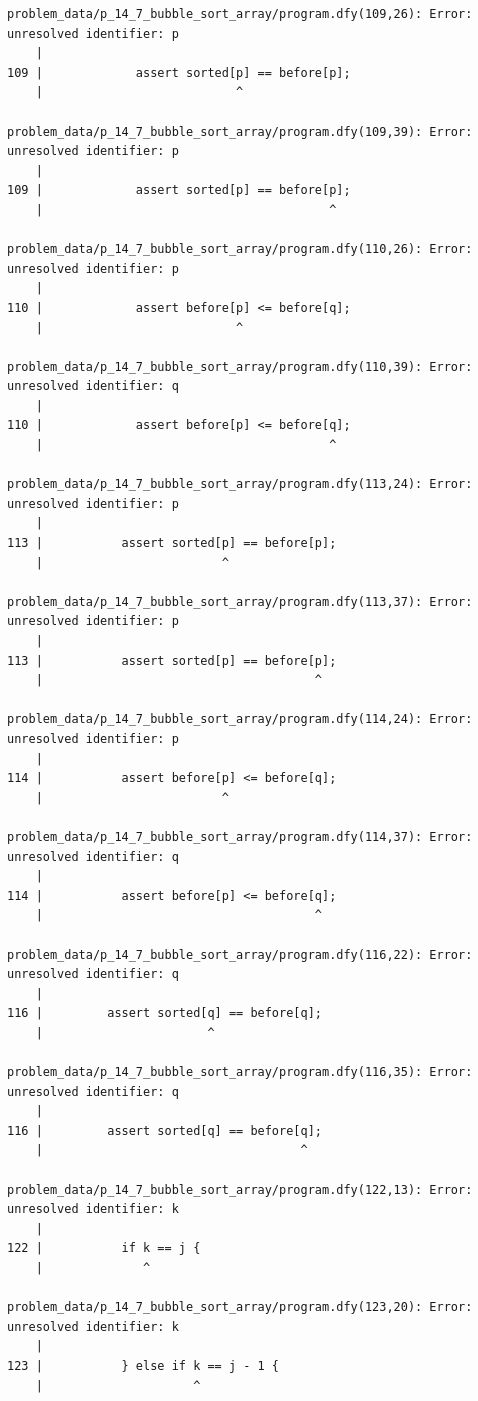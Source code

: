\documentclass{article}
\begin{document}
\begin{lstlisting}
problem_data/p_14_7_bubble_sort_array/program.dfy(109,26): Error: unresolved identifier: p
    |
109 |             assert sorted[p] == before[p];
    |                           ^

problem_data/p_14_7_bubble_sort_array/program.dfy(109,39): Error: unresolved identifier: p
    |
109 |             assert sorted[p] == before[p];
    |                                        ^

problem_data/p_14_7_bubble_sort_array/program.dfy(110,26): Error: unresolved identifier: p
    |
110 |             assert before[p] <= before[q];
    |                           ^

problem_data/p_14_7_bubble_sort_array/program.dfy(110,39): Error: unresolved identifier: q
    |
110 |             assert before[p] <= before[q];
    |                                        ^

problem_data/p_14_7_bubble_sort_array/program.dfy(113,24): Error: unresolved identifier: p
    |
113 |           assert sorted[p] == before[p];
    |                         ^

problem_data/p_14_7_bubble_sort_array/program.dfy(113,37): Error: unresolved identifier: p
    |
113 |           assert sorted[p] == before[p];
    |                                      ^

problem_data/p_14_7_bubble_sort_array/program.dfy(114,24): Error: unresolved identifier: p
    |
114 |           assert before[p] <= before[q];
    |                         ^

problem_data/p_14_7_bubble_sort_array/program.dfy(114,37): Error: unresolved identifier: q
    |
114 |           assert before[p] <= before[q];
    |                                      ^

problem_data/p_14_7_bubble_sort_array/program.dfy(116,22): Error: unresolved identifier: q
    |
116 |         assert sorted[q] == before[q];
    |                       ^

problem_data/p_14_7_bubble_sort_array/program.dfy(116,35): Error: unresolved identifier: q
    |
116 |         assert sorted[q] == before[q];
    |                                    ^

problem_data/p_14_7_bubble_sort_array/program.dfy(122,13): Error: unresolved identifier: k
    |
122 |           if k == j {
    |              ^

problem_data/p_14_7_bubble_sort_array/program.dfy(123,20): Error: unresolved identifier: k
    |
123 |           } else if k == j - 1 {
    |                     ^


\end{lstlisting}
\end{document}
